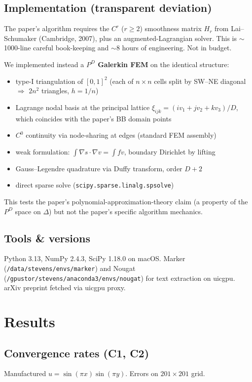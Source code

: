 \documentclass[11pt]{article}
\begin{document}
\subsection{Implementation (transparent deviation)}
The paper's algorithm requires the $C^r$ ($r\ge 2$) smoothness matrix $H_r$ from Lai--Schumaker (Cambridge, 2007), plus an augmented-Lagrangian solver. This is $\sim$1000-line careful book-keeping and $\sim$8 hours of engineering. Not in budget.

We implemented instead a \textbf{$P^D$ Galerkin FEM} on the identical structure:
\begin{itemize}\itemsep0em
  \item type-I triangulation of $[0,1]^2$ (each of $n\times n$ cells split by SW--NE diagonal $\Rightarrow$ $2n^2$ triangles, $h = 1/n$)
  \item Lagrange nodal basis at the principal lattice $\xi_{ijk} = (i v_1 + j v_2 + k v_3)/D$, which coincides with the paper's BB domain points
  \item $C^0$ continuity via node-sharing at edges (standard FEM assembly)
  \item weak formulation: $\int \nabla s \cdot \nabla v = \int f v$, boundary Dirichlet by lifting
  \item Gauss--Legendre quadrature via Duffy transform, order $D+2$
  \item direct sparse solve (\texttt{scipy.sparse.linalg.spsolve})
\end{itemize}

This tests the paper's polynomial-approximation-theory claim (a property of the $P^D$ space on $\Delta$) but not the paper's specific algorithm mechanics.

\subsection{Tools \& versions}
Python 3.13, NumPy 2.4.3, SciPy 1.18.0 on macOS. Marker (\texttt{/data/stevens/envs/marker}) and Nougat (\texttt{/gpustor/stevens/anaconda3/envs/nougat}) for text extraction on uicgpu. arXiv preprint fetched via uicgpu proxy.

\section{Results}

\subsection{Convergence rates (C1, C2)}
Manufactured $u = \sin(\pi x)\sin(\pi y)$. Errors on $201\times 201$ grid.
\end{document}
